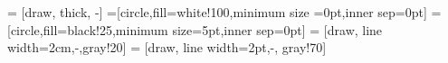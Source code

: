 \def\scale{0.07}


\setlength{\parskip}{5mm}

 = [draw, thick, -]
=[circle,fill=white!100,minimum size =0pt,inner sep=0pt]
=[circle,fill=black!25,minimum size=5pt,inner sep=0pt]
 = [draw, line width=2cm,-,gray!20] 
 = [draw, line width=2pt,-, gray!70]
